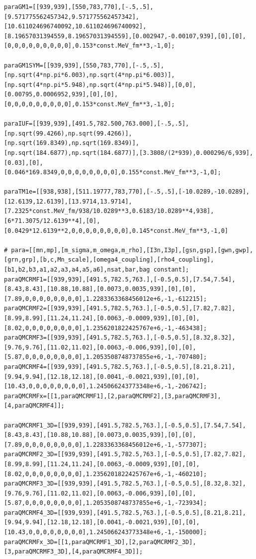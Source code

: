 \documentclass[12pt]{article}
\begin{document}
\begin{lstlisting}[style=mypython]
paraGM1=[[939,939],[550,783,770],[-.5,.5],[9.571775562457342,9.571775562457342],[10.611024696740092,10.611024696740092],[8.19657031394559,8.19657031394559],[0.002947,-0.00107,939],[0],[0],[0,0,0,0,0,0,0,0,0],0.153*const.MeV_fm**3,-1,0];

paraGM1SYM=[[939,939],[550,783,770],[-.5,.5],[np.sqrt(4*np.pi*6.003),np.sqrt(4*np.pi*6.003)],[np.sqrt(4*np.pi*5.948),np.sqrt(4*np.pi*5.948)],[0,0],[0.00795,0.0006952,939],[0],[0],[0,0,0,0,0,0,0,0,0],0.153*const.MeV_fm**3,-1,0];

paraIUF=[[939,939],[491.5,782.500,763.000],[-.5,.5],[np.sqrt(99.4266),np.sqrt(99.4266)],[np.sqrt(169.8349),np.sqrt(169.8349)],[np.sqrt(184.6877),np.sqrt(184.6877)],[3.3808/(2*939),0.000296/6,939],[0.03],[0],[0.046*169.8349,0,0,0,0,0,0,0,0],0.155*const.MeV_fm**3,-1,0];

paraTM1e=[[938,938],[511.19777,783,770],[-.5,.5],[-10.0289,-10.0289],[12.6139,12.6139],[13.9714,13.9714],[7.2325*const.MeV_fm/938/10.0289**3,0.6183/10.0289**4,938],[6*71.3075/12.6139**4],[0],[0.0429*12.6139**2,0,0,0,0,0,0,0,0],0.145*const.MeV_fm**3,-1,0]

# para=[[mn,mp],[m_sigma,m_omega,m_rho],[I3n,I3p],[gsn,gsp],[gwn,gwp],[grn,grp],[b,c,Mn_scale],[omega4_coupling],[rho4_coupling],[b1,b2,b3,a1,a2,a3,a4,a5,a6],nsat,bar,bag constant]; 
paraQMCRMF1=[[939,939],[491.5,782.5,763.],[-0.5,0.5],[7.54,7.54],[8.43,8.43],[10.88,10.88],[0.0073,0.0035,939],[0],[0],[7.89,0,0,0,0,0,0,0,0],1.2283363368456012e+6,-1,-612215];
paraQMCRMF2=[[939,939],[491.5,782.5,763.],[-0.5,0.5],[7.82,7.82],[8.99,8.99],[11.24,11.24],[0.0063,-0.0009,939],[0],[0],[8.02,0,0,0,0,0,0,0,0],1.2356201822425767e+6,-1,-463438];
paraQMCRMF3=[[939,939],[491.5,782.5,763.],[-0.5,0.5],[8.32,8.32],[9.76,9.76],[11.02,11.02],[0.0063,-0.006,939],[0],[0],[5.87,0,0,0,0,0,0,0,0],1.2053508748737855e+6,-1,-707480];
paraQMCRMF4=[[939,939],[491.5,782.5,763.],[-0.5,0.5],[8.21,8.21],[9.94,9.94],[12.18,12.18],[0.0041,-0.0021,939],[0],[0],[10.43,0,0,0,0,0,0,0,0],1.245066243773348e+6,-1,-206742];
paraQMCRMFx=[[1,paraQMCRMF1],[2,paraQMCRMF2],[3,paraQMCRMF3],[4,paraQMCRMF4]];

paraQMCRMF1_3D=[[939,939],[491.5,782.5,763.],[-0.5,0.5],[7.54,7.54],[8.43,8.43],[10.88,10.88],[0.0073,0.0035,939],[0],[0],[7.89,0,0,0,0,0,0,0,0],1.2283363368456012e+6,-1,-577307];
paraQMCRMF2_3D=[[939,939],[491.5,782.5,763.],[-0.5,0.5],[7.82,7.82],[8.99,8.99],[11.24,11.24],[0.0063,-0.0009,939],[0],[0],[8.02,0,0,0,0,0,0,0,0],1.2356201822425767e+6,-1,-460210];
paraQMCRMF3_3D=[[939,939],[491.5,782.5,763.],[-0.5,0.5],[8.32,8.32],[9.76,9.76],[11.02,11.02],[0.0063,-0.006,939],[0],[0],[5.87,0,0,0,0,0,0,0,0],1.2053508748737855e+6,-1,-723934];
paraQMCRMF4_3D=[[939,939],[491.5,782.5,763.],[-0.5,0.5],[8.21,8.21],[9.94,9.94],[12.18,12.18],[0.0041,-0.0021,939],[0],[0],[10.43,0,0,0,0,0,0,0,0],1.245066243773348e+6,-1,-150000];
paraQMCRMFx_3D=[[1,paraQMCRMF1_3D],[2,paraQMCRMF2_3D],[3,paraQMCRMF3_3D],[4,paraQMCRMF4_3D]];
\end{lstlisting}
\end{document}
